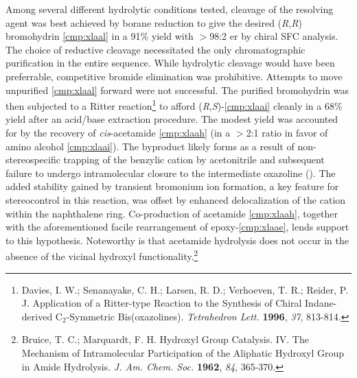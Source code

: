  Among several different hydrolytic conditions tested, cleavage
of the resolving agent was best achieved by borane reduction to give the desired
(\textit{R},\textit{R}) bromohydrin \ref{cmp:xlaal} in a 91\% yield with $>$98:2 er by chiral SFC
analysis. The choice of reductive cleavage necessitated the only chromatographic
purification in the entire sequence. While hydrolytic cleavage would have been preferrable,
competitive bromide elimination was prohibitive. Attempts to move unpurified \ref{cmp:xlaal} forward
were not successful. The purified bromohydrin was then subjected to a Ritter
reaction\footnote{{\frenchspacing Davies, I.
W.; Senanayake, C. H.; Larsen, R. D.; Verhoeven, T. R.; Reider, P. J. Application of a Ritter-type Reaction to the Synthesis of Chiral Indane-derived C$_2$-Symmetric Bis(oxazolines). \textit{Tetrahedron Lett.} \textbf{1996}, \textit{37}, 813-814.}} to afford (\textit{R},\textit{S})-\ref{cmp:xlaai} cleanly in a 68\% yield after an acid/base extraction procedure.
The modest yield was accounted for by the recovery of \textit{cis}-acetamide \ref{cmp:xlaah} (in a
$>$2:1 ratio in favor of amino alcohol \ref{cmp:xlaai}).  The byproduct likely forms as a result of
non-stereospecific trapping of the benzylic cation by acetonitrile and subsequent failure to undergo
intramolecular closure to the intermediate oxazoline (). The added
stability gained by transient bromonium ion formation, a key feature for stereocontrol in this
reaction, was offset by enhanced delocalization of the cation within the naphthalene ring.
Co-production of acetamide \ref{cmp:xlaah}, together with the aforementioned facile rearrangement of
epoxy-\ref{cmp:xlaae}, lends support to this hypothesis. Noteworthy is
that acetamide hydrolysis does not occur in the absence of the vicinal hydroxyl functionality.\footnote{{\frenchspacing Bruice, T. C.; Marquardt, F. H. Hydroxyl Group Catalysis.
IV. The Mechanism of Intramolecular Participation of the Aliphatic Hydroxyl Group in Amide
Hydrolysis. \textit{J. Am. Chem. Soc.} \textbf{1962}, \textit{84}, 365-370.}}
